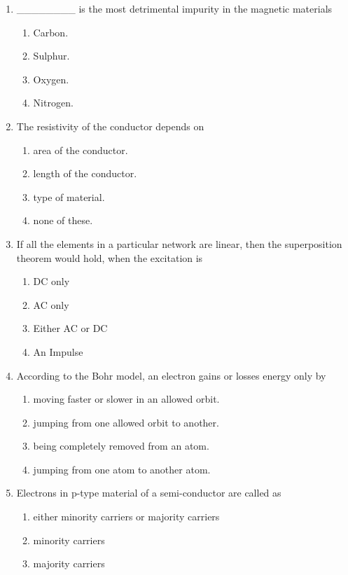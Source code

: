\documentclass[12pt]{article}
\begin{document}
\begin{enumerate}[label=\arabic*.]
\begin{enumerate}[label=(\alph*)]
\end{enumerate}
\item \_\_\_\_\_\_\_\_ is the most detrimental impurity in the magnetic materials
\begin{enumerate}[label=(\alph*)]
    \item Carbon.
    \item Sulphur.
    \item Oxygen.
    \item Nitrogen.
\end{enumerate}
\item The resistivity of the conductor depends on
\begin{enumerate}[label=(\alph*)]
    \item area of the conductor.
    \item length of the conductor.
    \item type of material.
    \item none of these.
\end{enumerate}
\item If all the elements in a particular network are linear, then the superposition theorem would hold, when the excitation is
\begin{enumerate}[label=(\alph*)]
    \item DC only
    \item AC only
    \item Either AC or DC
    \item An Impulse
\end{enumerate}
\item According to the Bohr model, an electron gains or losses energy only by
\begin{enumerate}[label=(\alph*)]
    \item moving faster or slower in an allowed orbit.
    \item jumping from one allowed orbit to another.
    \item being completely removed from an atom.
    \item jumping from one atom to another atom.
\end{enumerate}
\item Electrons in p-type material of a semi-conductor are called as
\begin{enumerate}[label=(\alph*)]
    \item either minority carriers or majority carriers
    \item minority carriers
    \item majority carriers

\end{enumerate}
\end{enumerate}
\end{document}
